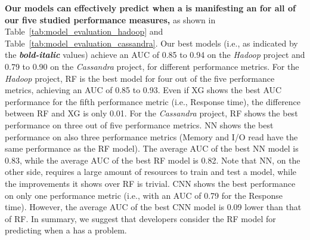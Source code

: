 
\noindent \textbf{Our models can effectively predict  when a \instance is manifesting an \inconsistent for all of our five studied performance measures,} as shown in Table~\ref{tab:model_evaluation_hadoop} and Table~\ref{tab:model_evaluation_cassandra}. %
Our best models (i.e., as indicated by the \textbf{\textit{bold-italic}} values) achieve an AUC of 0.85 to 0.94 on the \emph{Hadoop} project and 0.79 to 0.90 on the \emph{Cassandra} project, for different performance metrics.
For the \emph{Hadoop} project, %
RF is the best model for four out of the five performance metrics, achieving an AUC of 0.85 to 0.93. Even if XG shows the best AUC performance for the fifth performance metric (i.e., Response time), the difference between RF and XG is only 0.01. 
For the \emph{Cassandra} project, RF shows the best performance on three out of five performance metrics. NN shows the best performance on also three performance metrics (Memory and I/O read have the same performance as the RF model). The average AUC of the best NN model is 0.83, while the average AUC of the best RF model is 0.82. 
Note that %
NN, on the other side, requires a large amount of resources to train and test a model, while the improvements it shows over RF is trivial.
CNN shows the best performance on only one performance metric (i.e., with an AUC of 0.79 for the Response time). However, the average AUC of the best CNN model is 0.09 lower than that of RF. 
In summary, we suggest that developers consider the RF model for predicting when a \instance has a \inconsistent problem. 

